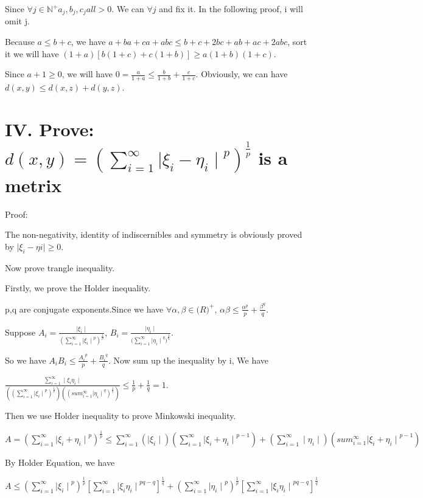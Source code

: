 \documentclass[twoside,a4paper]{article}
\begin{document}
Since $\forall j \in \mathbb{N}^+ a_{j}, b_{j}, c_{j} all > 0$. We can $\forall j$ and fix it. In the following proof, i will omit j.

Because $a \leq b + c$, we have $a + ba + ca + abc \leq b + c + 2bc + ab + ac + 2abc$, sort it we will have $(1 + a)[b(1 + c) + c(1 + b)] \geq a(1 + b)(1 + c)$.

Since $a + 1 \geq 0$, we will have $0 = \frac{a}{1 + a} \leq \frac{b}{1 + b} + \frac{c}{1 + c}$. Obviously, we can have $d(x,y) \leq d(x,z) + d(y,z)$.

\section*{IV. \small{Prove: $d(x,y) = (\sum_{i=1}^{\infty}{\mid\xi_{i} - \eta_{i}\mid}^{p})^{\frac{1}{p}}$ is a metrix}}

Proof:

The non-negativity, identity of indiscernibles and symmetry is obviously proved by $\mid\xi_{i} - \eta{i}\mid \geq 0$.

Now prove trangle inequality.

Firstly, we prove the Holder inequality.

p,q are conjugate exponents.Since we have $\forall \alpha,\beta \in \mathbb(R)^+$, $\alpha\beta \leq \frac{\alpha^p}{p} + \frac{\beta^q}{q}$.

Suppose $A_{i} = \frac{\mid\xi_{i}\mid}{(\sum_{i=1}^{\infty}{{\mid\xi_{i}\mid}^p})^{\frac{1}{p}}}$, $B_{i} = \frac{\mid\eta_{i}\mid}{(\sum_{i=1}^{\infty}{{\mid\eta_{i}\mid}^q)}^{\frac{1}{q}}}$. 

So we have $A_{i}B_{i} \leq \frac{{A_{i}}^p}{p} + \frac{{B_{i}}^q}{q}$. Now sum up the inequality by i, We have 

$\frac{\sum_{i=1}^{\infty}\mid\xi_{i}\eta_{i}\mid}{({(\sum_{i=1}^{\infty}{{\mid\xi_{i}\mid}^{p}})}^{\frac{1}{p}})({({sum_{i=1}^{\infty}{\mid\eta_{i}\mid}^q})}^{\frac{1}{q}})} \leq \frac{1}{p} + \frac{1}{q} = 1$.

Then we use Holder inequality to prove Minkowski inequality.

$A = (\sum_{i=1}^{\infty}{\mid\xi_{i} + \eta_{i}\mid}^{p})^{\frac{1}{p}} \leq \sum_{i=1}^{\infty}({\mid\xi_{i}\mid})(\sum_{i=1}^{\infty}{\mid\xi_{i} + \eta_{i}\mid}^{p-1}) + (\sum_{i=1}^{\infty}\mid\eta_{i}\mid)(sum_{i=1}^{\infty}{\mid\xi_{i} + \eta_{i}\mid}^{p-1})$

By Holder Equation, we have 

$A \leq (\sum_{i=1}^{\infty}{\mid\xi_{i}\mid}^{p})^{\frac{1}{p}}[\sum_{i=1}^{\infty}{\mid\xi_{i}\eta_{i}\mid}^{pq-q}]^{\frac{1}{q}} + (\sum_{i=1}^{\infty}{\mid\eta_{i}\mid}^{p})^{\frac{1}{p}}[\sum_{i=1}^{\infty}{\mid\xi_{i}\eta_{i}\mid}^{pq-q}]^{\frac{1}{q}}$
\end{document}
